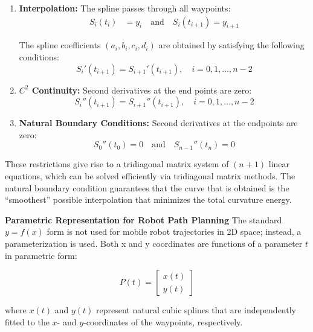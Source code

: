 \begin{enumerate}[noitemsep]
\item \textbf{Interpolation:} The spline passes through all waypoints:
\begin{align}
S_i(t_i) &= y_i \quad \text{and} \quad S_i(t_{i+1}) = y_{i+1}
\end{align}

The spline coefficients $(a_i, b_i, c_i, d_i)$ are obtained by satisfying the following conditions:
\begin{equation}
S_i'(t_{i+1}) = S_{i+1}'(t_{i+1}), \quad i = 0, 1, \ldots, n - 2
\end{equation}

\item \textbf{$C^2$ Continuity:} Second derivatives at the end points are zero:
\begin{equation}
S_i''(t_{i+1}) = S_{i+1}''(t_{i+1}), \quad i = 0, 1, \ldots, n - 2
\end{equation}

\item \textbf{Natural Boundary Conditions:} Second derivatives at the endpoints are zero:
\begin{equation}
S_0''(t_0) = 0 \quad \text{and} \quad S_{n-1}''(t_n) = 0
\end{equation}
\end{enumerate}

These restrictions give rise to a tridiagonal matrix system of $(n+1)$ linear equations, which can be solved efficiently via tridiagonal matrix methods. The natural boundary condition guarantees that the curve that is obtained is the ``smoothest'' possible interpolation that minimizes the total curvature energy.

\textbf{Parametric Representation for Robot Path Planning}
The standard $y = f(x)$ form is not used for mobile robot trajectories in 2D space; instead, a parameterization is used. Both x and y coordinates are functions of a parameter $t$ in parametric form:

\begin{equation}
P(t) = \begin{bmatrix} x(t) \\ y(t) \end{bmatrix}
\end{equation}

where \(x(t)\) and \(y(t)\) represent natural cubic splines that are independently fitted to the \(x\)- and \(y\)-coordinates of the waypoints, respectively.

